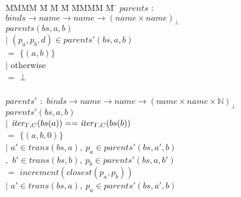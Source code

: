 \begin{figure}
%
\begin{tabbing}
MMMM \= M \= M \= M \= MMMM \= M \= \kill
$parents$ \> $:$ \> $binds \to name \to name \to (name \times name)_\bot$ \\
$parents(bs, a, b)$ \\
        \> $|$ \> $(p_a,p_b,d) \in parents'(bs,a,b)$ \\
        \>     \>                      \> $=$ \> $\{(a, b)\}$ \\
        \> $|$ \> otherwise \\
        \>     \>                      \> $=$    \> $\bot$ \\
\\
$parents'$ \> $:$ \> $binds \to name \to name \to (name \times name \times \mathbb{N})_\bot$ \\
$parents'(bs, a, b)$ \\
        \> $|$ \> $\mathit{iter}_{\Gamma,C}(bs(a)) == \mathit{iter}_{\Gamma,C}(bs(b))$ \\
        \>     \>                      \> $=$ \> $\{(a, b, 0)\}$ \\
        \> $|$ \> $a' \in trans(bs,a),~ p_a \in parents'(bs,a',b)$ \\
        \> $,$ \> $b' \in trans(bs,b),~ p_b \in parents'(bs,a,b')$ \\
        \>     \>                      \> $=$ \> $increment(closest(p_a, p_b))$ \\
        \> $|$ \> $a' \in trans(bs,a),~ p_a \in parents'(bs,a',b)$ \\

\end{tabbing}
\end{figure}
